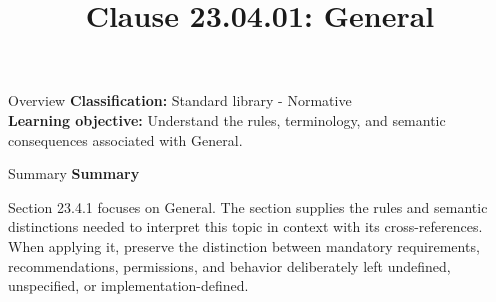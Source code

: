 \documentclass[10pt,letterpaper]{article}
\title{Clause 23.04.01: General}
\author{}
\date{}
\begin{document}
\maketitle
\begin{CornellOverviewBox}{Overview}
\textbf{Classification:} Standard library - Normative\\[2pt]
\textbf{Learning objective:} Understand the rules, terminology, and semantic consequences associated with General.
\end{CornellOverviewBox}\begin{CornellSummaryBox}{Summary}
{\sffamily\bfseries\color{Accent} Summary}\par\vspace{3pt}Section 23.4.1 focuses on General. The section supplies the rules and semantic distinctions needed to interpret this topic in context with its cross-references. When applying it, preserve the distinction between mandatory requirements, recommendations, permissions, and behavior deliberately left undefined, unspecified, or implementation-defined.
\end{CornellSummaryBox}
\end{document}
